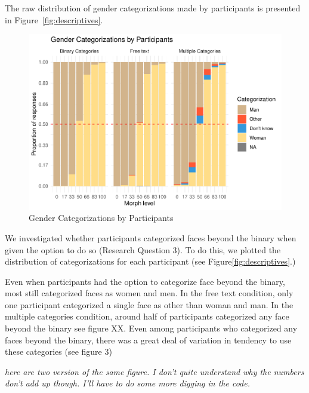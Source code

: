 \documentclass[
  man]{apa7}
\begin{document}
The raw distribution of gender categorizations made by participants is presented in Figure~\ref{fig:descriptives}.

\begin{figure}
\centering
\includegraphics{RO_revisions_doc_files/figure-latex/descriptives-1-1.pdf}
\caption{\label{fig:descriptives-1}Gender Categorizations by Participants}
\end{figure}

We investigated whether participants categorized faces beyond the binary when given the option to do so (Research Question 3). To do this, we plotted the distribution of categorizations for each participant (see Figure\ref{fig:descriptives}.)

Even when participants had the option to categorize face beyond the binary, most still categorized faces as women and men. In the free text condition, only one participant categorized a single face as other than woman and man. In the multiple categories condition, around half of participants categorized any face beyond the binary see figure XX. Even among participants who categorized any faces beyond the binary, there was a great deal of variation in tendency to use these categories (see figure 3)

\emph{here are two version of the same figure. I don't quite understand why the numbers don't add up though. I'll have to do some more digging in the code. }
\end{document}
